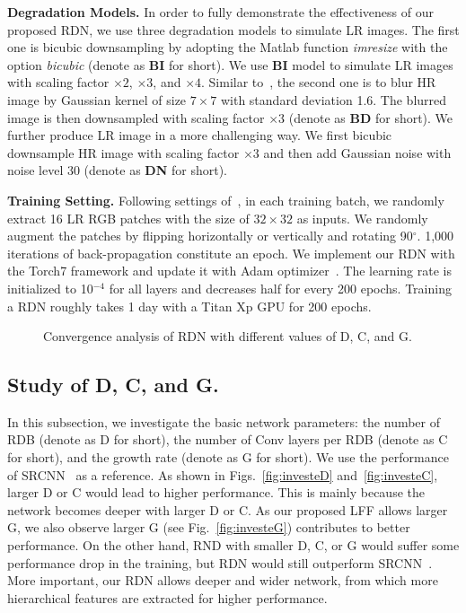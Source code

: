 \documentclass[10pt,twocolumn,letterpaper]{article}
\begin{document}
\textbf{Degradation Models.} In order to fully demonstrate the effectiveness of our proposed RDN, we use three degradation models to simulate LR images. The first one is bicubic downsampling by adopting the Matlab function \textit{imresize} with the option \textit{bicubic} (denote as \textbf{BI} for short). We use \textbf{BI} model to simulate LR images with scaling factor $\times2$, $\times3$, and $\times4$. Similar to~\cite{zhang2017learning}, the second one is to blur HR image by Gaussian kernel of size $7\times7$ with standard deviation 1.6. The blurred image is then downsampled with scaling factor $\times3$ (denote as \textbf{BD} for short). We further produce LR image in a more challenging way. We first bicubic downsample HR image with scaling factor $\times3$ and then add Gaussian noise with noise level 30 (denote as \textbf{DN} for short). 

\textbf{Training Setting.}
Following settings of~\cite{lim2017enhanced}, in each training batch, we randomly extract 16 LR RGB patches with the size of $32\times32$ as inputs. We randomly augment the patches by flipping horizontally or vertically and rotating 90$^{\circ}$. 1,000 iterations of back-propagation constitute an epoch. We implement our RDN with the Torch7 framework and update it with Adam optimizer~\cite{kingma2014adam}. The learning rate is initialized to 10$^{-4}$ for all layers and decreases half for every 200 epochs. Training a RDN roughly takes 1 day with a Titan Xp GPU for 200 epochs.
\vspace{-4mm}
\begin{figure}[htbp]
\scriptsize
\centering
\centerline{
}
\vspace{-1mm}
\caption{Convergence analysis of RDN with different values of D, C, and G.}  
\label{fig:study_D_C_G}
\vspace{-4mm}
\end{figure}

\subsection{Study of D, C, and G.}
\label{subsec:study_DCG}
In this subsection, we investigate the basic network parameters: the number of RDB (denote as D for short), the number of Conv layers per RDB (denote as C for short), and the growth rate (denote as G for short). We use the performance of SRCNN~\cite{dong2016image} as a reference. As shown in Figs.~\ref{fig:investeD} and~\ref{fig:investeC}, larger D or C would lead to higher performance. This is mainly because the network becomes deeper with larger D or C. As our proposed LFF allows larger G, we also observe larger G (see Fig.~\ref{fig:investeG}) contributes to better performance. On the other hand, RND with smaller D, C, or G would suffer some performance drop in the training, but RDN would still outperform SRCNN~\cite{dong2016image}. More important, our RDN allows deeper and wider network, from which more hierarchical features are extracted for higher performance.       
\end{document}
